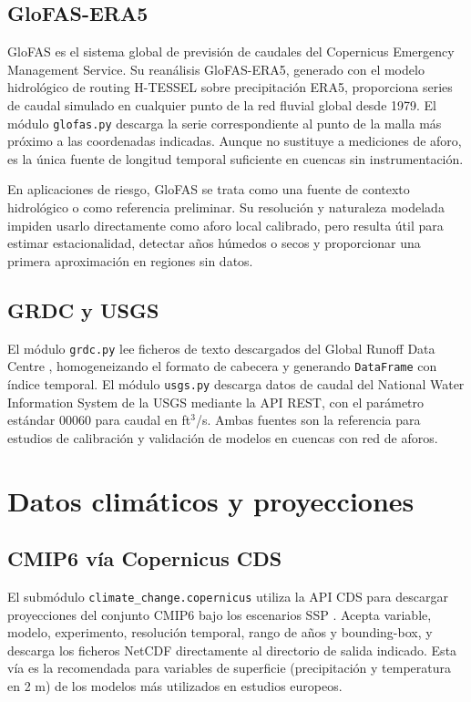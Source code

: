 \subsection{GloFAS-ERA5}

GloFAS \parencite{alfieri2013glofas} es el sistema global de previsión de caudales del Copernicus Emergency Management Service. Su reanálisis GloFAS-ERA5, generado con el modelo hidrológico de routing H-TESSEL sobre precipitación ERA5, proporciona series de caudal simulado en cualquier punto de la red fluvial global desde 1979. El módulo \texttt{glofas.py} descarga la serie correspondiente al punto de la malla más próximo a las coordenadas indicadas. Aunque no sustituye a mediciones de aforo, es la única fuente de longitud temporal suficiente en cuencas sin instrumentación.

En aplicaciones de riesgo, GloFAS se trata como una fuente de contexto hidrológico o como referencia preliminar. Su resolución y naturaleza modelada impiden usarlo directamente como aforo local calibrado, pero resulta útil para estimar estacionalidad, detectar años húmedos o secos y proporcionar una primera aproximación en regiones sin datos.

\subsection{GRDC y USGS}

El módulo \texttt{grdc.py} lee ficheros de texto descargados del Global Runoff Data Centre \parencite{grdcportal}, homogeneizando el formato de cabecera y generando \texttt{DataFrame} con índice temporal. El módulo \texttt{usgs.py} descarga datos de caudal del National Water Information System de la USGS \parencite{usgsnwis} mediante la API REST, con el parámetro estándar 00060 para caudal en ft$^3$/s. Ambas fuentes son la referencia para estudios de calibración y validación de modelos en cuencas con red de aforos.

\section{Datos climáticos y proyecciones}

\subsection{CMIP6 vía Copernicus CDS}

El submódulo \texttt{climate\_change.copernicus} utiliza la API CDS \parencite{copernicuscds} para descargar proyecciones del conjunto CMIP6 \parencite{eyring2016cmip6} bajo los escenarios SSP \parencite{oneill2016ssp}. Acepta variable, modelo, experimento, resolución temporal, rango de años y bounding-box, y descarga los ficheros NetCDF directamente al directorio de salida indicado. Esta vía es la recomendada para variables de superficie (precipitación y temperatura en 2 m) de los modelos más utilizados en estudios europeos.

